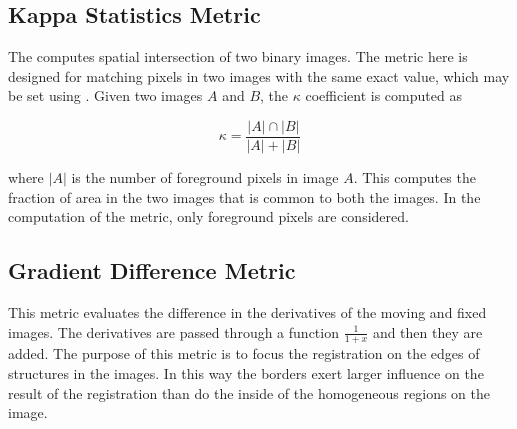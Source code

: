 \subsection{Kappa Statistics Metric}
The  computes spatial intersection of
two binary images. The metric here is designed for matching pixels in two images
with the same exact value, which may be set using .
Given two images $A$ and $B$, the $\kappa$ coefficient is computed as

\begin{equation}
\kappa = \frac{|A| \cap |B|}{|A| + |B|}
\end{equation}

where $|A|$ is the number of foreground pixels in image $A$.  This computes the
fraction of area in the two images that is common to both the images. In the
computation of the metric, only foreground pixels are considered.

\subsection{Gradient Difference Metric}

This  metric evaluates the
difference in the derivatives of the moving and fixed images. The derivatives
are passed through a function $\frac{1}{1+x}$ and then they are added. The
purpose of this metric is to focus the registration on the edges of structures
in the images.  In this way the borders exert larger influence on the result
of the registration than do the inside of the homogeneous regions on the image.


